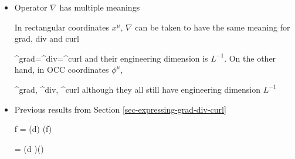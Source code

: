 \begin{itemize}
Paying attention to
the engineering dimensions of the quantities used in this section can be very helpful
in spotting mistakes.

Suppose the position vector in
the coordinate basis is

\beq
\vecr= x^i
\eeq
Then

\beq
\engdim{\vecr}= =L,
\quad\quad
{} =
=
= L^0
\eeq

\beq
\engdim{\phi^\mu} =L^0,
\quad\quad
\engdim{\vecpder{\phi^\mu}}
=\engdim{\pder{\vecr}{\phi^\mu}}
= L
\eeq

\beq
\engdim{\elli{\mu}} =L,
\quad\quad
\engdim{\hat{\phi}_\mu} =
=
= L^0
\eeq
Note that unit vectors are always dimensionless.

For a scalar dimensionless function $f$ 
\beq
{}=
=
= L^{-1},
\quad 
{}=
 = L^0
\eeq
so the gradient of $f$
and $\pder{f}{x^\mu}$ have dimensions of 
$L^{-1}$, whereas the tangent 
vector $\vecpder{x^\mu}$ is dimensionless.

As far as the metric
and its inverse
are concerned, their
dimensions are
 
\beq
\engdim{\metric_{\mu\nu}}= L^2,
\quad
\engdim{\metric^{\mu\nu}}= L^{-2}
\eeq


\item Operator $\nabla$ has multiple meanings

In rectangular coordinates $x^\mu$,
$\nabla$ can be taken
to have the same meaning
for grad, div and curl

\beq
\nabla^{grad}=\nabla^{div}=\nabla^{curl}
\eeq
and their engineering dimension is $L^{-1}$.
On the other hand, in OCC coordinates $\phi^\mu$, 
 
\beq
\nabla^{grad}, \nabla^{div}, \nabla^{curl}\quad {}
\eeq
although they
all still have 
engineering 
dimension $L^{-1}$

\item Previous results from Section
\ref{sec-expressing-grad-div-curl}

\beq
\bcen
{}\ecen
\quad\quad
\boxed
{\nabla f =
(\sharp \;d) (f)}
\eeq

\beq
\bcen
{}\ecen
\quad\quad
\boxed
{\nabla \times \vecV=
(\sharp \star  d \; \flat)(\vecV)}
\label{eq-curl-V-star-d-copy}
\eeq


\end{itemize}
